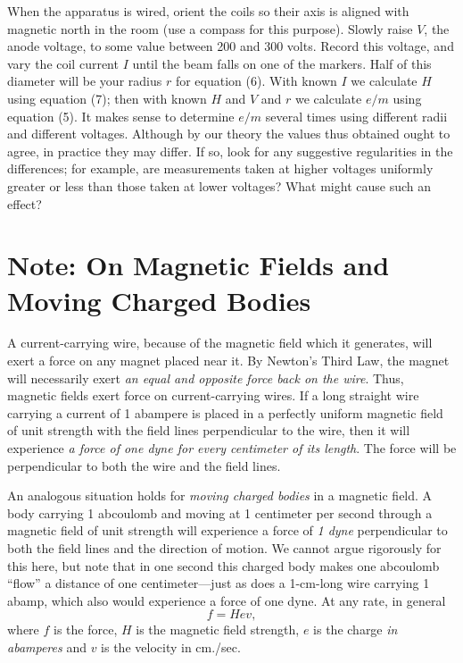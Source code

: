 When the apparatus is wired, orient the coils so their axis is aligned
with magnetic north in the room (use a compass for
this purpose). Slowly raise $V$, the anode voltage, to some value between 200 and 300 volts. 
Record this voltage, and vary the coil current $I$ until the beam falls on one
of the markers. Half of this diameter will be your radius $r$ for equation (6). 
With known $I$ we calculate $H$ using equation
(7); then with known $H$ and $V$ and $r$ we calculate
$e/m$ using equation (5). It makes sense to determine $e/m$
several times using different radii and different voltages. Although by
our theory the values thus obtained ought to agree, in practice they may
differ. If so, look for any suggestive regularities in the differences;
for example, are measurements taken at higher voltages uniformly greater
or less than those taken at lower voltages? What might cause such an
effect?


\section*{Note: On Magnetic Fields and Moving Charged Bodies}\label{n:thomson}

A current-carrying wire, because of the magnetic field which it generates,
will exert a force on any magnet placed near it. By Newton's Third Law,
the magnet will necessarily exert \emph{an equal and opposite force back
on the wire}. Thus, magnetic fields exert force on current-carrying
wires. If a long straight wire carrying a current of 1 abampere is
placed in a perfectly uniform magnetic field of unit strength with the
field lines perpendicular to the wire, then it will experience \emph{a
force of one dyne for every centimeter of its length}. The force will be
perpendicular to both the wire and the field lines.

An analogous situation holds for \emph{moving charged bodies} in a
magnetic field. A body carrying 1 abcoulomb and moving at 1 centimeter
per second through a magnetic field of unit strength will experience a
force of \emph{1 dyne} perpendicular to both the field lines and the
direction of motion. We cannot argue rigorously for this here, but note
that in one second this charged body makes one abcoulomb ``flow'' a
distance of one centimeter---just as does a 1-cm-long wire carrying 1
abamp, which also would experience a force of one dyne. At any rate, in
general
\begin{equation*}
f = Hev ,
\end{equation*}
where $f$ is the force, $H$ is the magnetic field strength,
$e$ is the charge \emph{in abamperes} and $v$ is the velocity
in cm./sec.

